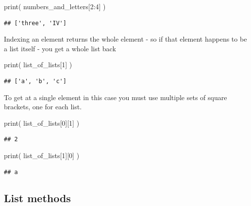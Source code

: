 \documentclass[]{book}
\newenvironment{Shaded}{\begin{snugshade}}{\end{snugshade}}
\newcommand{\BuiltInTok}[1]{#1}
\newcommand{\DecValTok}[1]{\textcolor[rgb]{0.00,0.00,0.81}{#1}}
\newcommand{\NormalTok}[1]{#1}
\theoremstyle{definition}
\theoremstyle{definition}
\theoremstyle{definition}
\theoremstyle{remark}
\begin{document}
\begin{Shaded}
\begin{Highlighting}[]
\BuiltInTok{print}\NormalTok{( numbers_and_letters[}\DecValTok{2}\NormalTok{:}\DecValTok{4}\NormalTok{] )}
\end{Highlighting}
\end{Shaded}

\begin{verbatim}
## ['three', 'IV']
\end{verbatim}

Indexing an element returns the whole element - so if that element
happens to be a list itself - you get a whole list back

\begin{Shaded}
\begin{Highlighting}[]
\BuiltInTok{print}\NormalTok{( list_of_lists[}\DecValTok{1}\NormalTok{] )}
\end{Highlighting}
\end{Shaded}

\begin{verbatim}
## ['a', 'b', 'c']
\end{verbatim}

To get at a single element in this case you must use multiple sets of
square brackets, one for each list.

\begin{Shaded}
\begin{Highlighting}[]
\BuiltInTok{print}\NormalTok{( list_of_lists[}\DecValTok{0}\NormalTok{][}\DecValTok{1}\NormalTok{] )}
\end{Highlighting}
\end{Shaded}

\begin{verbatim}
## 2
\end{verbatim}

\begin{Shaded}
\begin{Highlighting}[]
\BuiltInTok{print}\NormalTok{( list_of_lists[}\DecValTok{1}\NormalTok{][}\DecValTok{0}\NormalTok{] )}
\end{Highlighting}
\end{Shaded}

\begin{verbatim}
## a
\end{verbatim}

\hypertarget{list-methods}{%
\subsection{List methods}\label{list-methods}}
\end{document}
